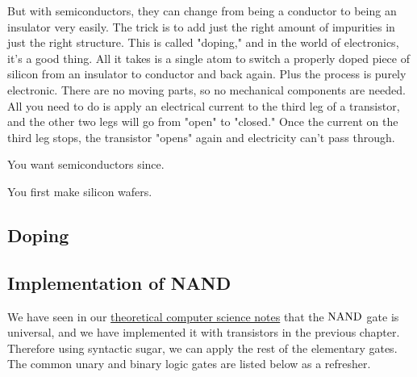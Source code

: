   But with semiconductors, they can change from being a conductor to being an insulator very easily. The trick is to add just the right amount of impurities in just the right structure. This is called "doping," and in the world of electronics, it's a good thing. All it takes is a single atom to switch a properly doped piece of silicon from an insulator to conductor and back again. Plus the process is purely electronic. There are no moving parts, so no mechanical components are needed. All you need to do is apply an electrical current to the third leg of a transistor, and the other two legs will go from "open" to "closed." Once the current on the third leg stops, the transistor "opens" again and electricity can't pass through. 

  You want semiconductors since. 

  You first make silicon wafers. 

\subsection{Doping}

\subsection{Implementation of NAND} 

  We have seen in our \hyperref[th-thm:nand_univ]{theoretical computer science notes} that the $\operatorname{NAND}$ gate is universal, and we have implemented it with transistors in the previous chapter. Therefore using syntactic sugar, we can apply the rest of the elementary gates. The common unary and binary logic gates are listed below as a refresher. 


